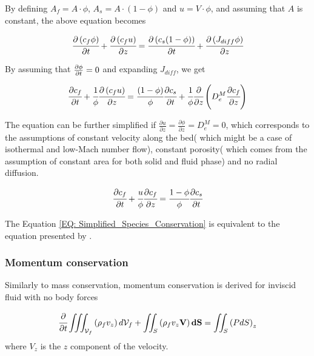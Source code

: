 \documentclass[../Article_Sensitivity_Analsysis.tex]{subfiles}
\begin{document}
	By defining $A_f = A \cdot \phi$, $A_s = A \cdot \left( 1-\phi \right)$ and $u=V \cdot \phi$, and assuming that $A$ is constant, the above equation becomes
	
	{\footnotesize
		\begin{equation}
			\cfrac{\partial \left( c_f \phi \right)}{\partial t} + \cfrac{\partial \left( c_f u\right)}{\partial z} = \cfrac{\partial \left( c_s (1-\phi) \right) }{\partial t} + \cfrac{\partial \left( J_{diff} \phi \right) }{\partial z}
		\end{equation}
	}

	By assuming that ${\footnotesize \frac{\partial \phi}{\partial t}=0}$ and expanding $J_{diff}$, we get
	
	{\footnotesize
		\begin{equation}
			\cfrac{\partial c_f}{\partial t} + \cfrac{1}{\phi} \cfrac{\partial \left( c_f u\right)}{\partial z} = \cfrac{ (1-\phi)}{\phi} \cfrac{\partial c_s }{\partial t} + \cfrac{1}{\phi} \cfrac{\partial}{\partial z} \left( D_e^M \cfrac{\partial c_f}{\partial z} \right)
		\end{equation}
	}
	
	The equation can be further simplified if $\frac{\partial u}{\partial z} = \frac{\partial \phi}{\partial z} = D_e^M = 0$, which corresponds to the assumptions of constant velocity along the bed( which might be a case of isothermal and low-Mach number flow), constant porosity( which comes from the assumption of constant area for both solid and fluid phase) and no radial diffusion.
	
	{\footnotesize
		\begin{equation}
			\cfrac{\partial c_f}{\partial t} + \cfrac{u}{\phi} \cfrac{\partial c_f}{\partial z}  = \cfrac{1-\phi}{\phi} \cfrac{\partial c_s}{\partial t} 
			\label{EQ: Simplified_Species_Conservation}
		\end{equation}
	}

	The Equation \ref{EQ: Simplified_Species_Conservation} is equivalent to the equation presented by \citet{Reverchon1996}.
	
	\subsubsection{Momentum conservation}
	
	Similarly to mass conservation, momentum conservation is derived for inviscid fluid with no body forces
	
	{\footnotesize
		\begin{equation}
			\cfrac{\partial}{\partial t} \iiint_{\mathcal{V}_f} \left( \rho_f v_z \right) d\mathcal{V}_f + \iint_S \left( \rho_f v_z \textbf{V} \right) \textbf{dS} = \iint_S \left( P dS \right)_z
			\label{EQ: Momentum_Integral_Form}
		\end{equation}
	}
	where $V_z$ is the $z$ component of the velocity.
\end{document}
